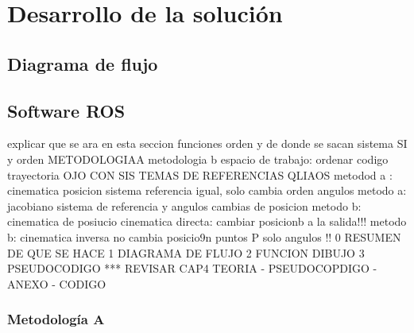 \chapter{Desarrollo de la solución}\label{CAP6}

\section{Diagrama de flujo}
        \newpage

\section{Software ROS}
    explicar que se ara en esta seccion funciones orden y de donde se sacan sistema SI y orden 
    METODOLOGIAA
    metodologia b
    espacio de trabajo: ordenar codigo
    trayectoria 
    OJO CON SIS TEMAS DE REFERENCIAS QLIAOS
     metodod a : cinematica posicion sistema referencia igual, solo cambia orden angulos
     metodo a: jacobiano sistema de referencia y angulos cambias de posicion
     metodo b: cinematica de posiucio cinematica directa: cambiar posicionb a la salida!!! 
     metodo b: cinematica inversa no cambia posicio9n puntos P solo angulos
     !! 
        0 RESUMEN DE QUE SE HACE 
        1 DIAGRAMA DE FLUJO     
        2 FUNCION DIBUJO
        3 PSEUDOCODIGO
        *** REVISAR CAP4 TEORIA - PSEUDOCOPDIGO - ANEXO - CODIGO
     
     
     
        \newpage

    \subsection{Metodología A}

